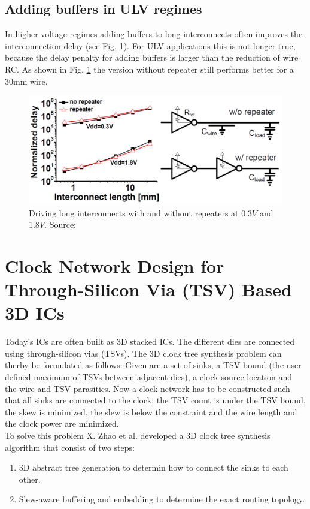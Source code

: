 \documentclass[conference]{IEEEtran}
\begin{document}
\subsection{Adding buffers in ULV regimes}
In higher voltage regimes adding buffers to long interconnects often improves the interconnection delay (see Fig. \ref{fig:repeater}). For ULV applications this is not longer true, because the delay penalty for adding buffers is larger than the reduction of wire RC. As shown in Fig. \ref{fig:repeater} the version without repeater still performs better for a 30mm wire.

\begin{figure}[htbp]
	\includegraphics[width=0.8\linewidth]{img/repeater.png}
	\centering
	\caption{Driving long interconnects with and without repeaters at 0.3$V$ and 1.8$V$. Source: \cite{b1}}
	\label{fig:repeater}
\end{figure}


\section{Clock Network Design for Through-Silicon Via (TSV) Based 3D ICs} \label{sec:tsv_design}
Today's ICs are often built as 3D stacked ICs. The different dies are connected using through-silicon vias (TSVs). The 3D clock tree synthesis problem can therby be formulated as follows: Given are a set of sinks, a TSV bound (the user defined maximum of TSVs between adjacent dies), a clock source location and the wire and TSV parasitics. Now a clock network has to be constructed such that all sinks are connected to the clock, the TSV count is under the TSV bound, the skew is minimized, the slew is below the constraint and the wire length and the clock power are minimized.\\
To solve this problem X. Zhao et al. \cite{b2} developed a 3D clock tree synthesis algorithm that consist of two steps:
\begin{enumerate}
\item 3D abstract tree generation to determin how to connect the sinks to each other.
\item Slew-aware buffering and embedding to determine the exact routing topology.
\end{enumerate}
\end{document}

